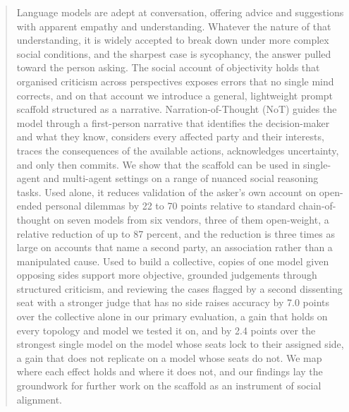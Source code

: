 \begin{abstract}
Language models are adept at conversation, offering advice and suggestions
with apparent empathy and understanding. Whatever the nature of that
understanding, it is widely accepted to break down under more complex social
conditions, and the sharpest case is sycophancy, the answer pulled toward the
person asking. The social account of objectivity holds that organised
criticism across perspectives exposes errors that no single mind corrects,
and on that account we introduce a general, lightweight prompt scaffold
structured as a narrative. Narration-of-Thought (NoT) guides the model
through a first-person narrative that identifies the decision-maker and what
they know, considers every affected party and their interests, traces the
consequences of the available actions, acknowledges uncertainty, and only
then commits. We show that the scaffold can be used in single-agent and
multi-agent settings on a range of nuanced social reasoning tasks. Used alone,
it reduces validation of the asker's own account on open-ended personal
dilemmas by 22 to 70 points
relative to standard chain-of-thought on seven models from six vendors,
three of them open-weight, a relative reduction of up to 87 percent,
and the reduction is three times as large on accounts that name a second
party, an association rather than a manipulated cause.
Used to build a collective, copies of one model given opposing sides
support more objective, grounded judgements through structured criticism,
and reviewing the cases flagged by a second dissenting seat with a stronger
judge that has no side raises accuracy by 7.0 points over the collective
alone in our primary evaluation, a gain that holds on every topology and
model we tested it on,
and by 2.4 points over the strongest single model on the model whose seats
lock to their assigned side, a gain that does not replicate on a model
whose seats do not.
We map where each effect holds and where it does not, and our findings lay
the groundwork for further work on the scaffold as an instrument of social
alignment.
\end{abstract}
